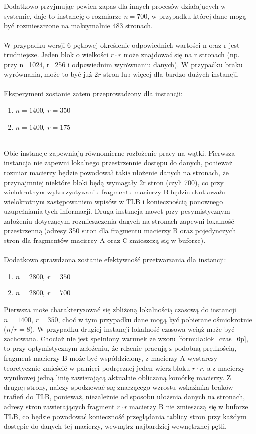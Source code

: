 \documentclass[12pt,a4paper]{article}
\begin{document}
Dodatkowo przyjmując pewien zapas dla innych procesów działających w systemie, daje to instancję o rozmiarze $n=700$, w przypadku której dane mogą być rozmieszczone na maksymalnie 483 stronach.\\
\\
W przypadku wersji 6 pętlowej określenie odpowiednich wartości n oraz r jest trudniejsze. Jeden blok o wielkości $r \cdot r$ może znajdować się na r stronach (np. przy n=1024, r=256 i odpowiednim wyrównaniu danych). W przypadku braku wyrównania, może to być już $2r$ stron lub więcej dla bardzo dużych instancji.\\
\\
Eksperyment zostanie zatem przeprowadzony dla instancji:
\begin{enumerate}[noitemsep]
\item $n=1400,~r=350$
\item $n=1400,~r=175$
\end{enumerate}
~\\
Obie instancje zapewniają równomierne rozłożenie pracy na wątki. Pierwsza instancja nie zapewni lokalnego przestrzennie dostępu do danych, ponieważ rozmiar macierzy będzie powodował takie ułożenie danych na stronach, że przynajmniej niektóre bloki będą wymagały 2r stron (czyli 700), co przy wielokrotnym wykorzystywaniu fragmentu macierzy B będzie skutkowało wielokrotnym zastępowaniem wpisów w TLB i koniecznością ponownego uzupełniania tych informacji. Druga instancja nawet przy pesymistycznym założeniu dotyczącym rozmieszczenia danych na stronach zapewni lokalność przestrzenną (adresy 350 stron dla fragmentu macierzy B oraz pojedynczych stron dla fragmentów macierzy A oraz C zmieszczą się w buforze).\\
\\
Dodatkowo sprawdzona zostanie efektywność przetwarzania dla instancji:
\begin{enumerate}[noitemsep]
\item $n=2800,~r=350$
\item $n=2800,~r=700$
\end{enumerate}

Pierwsza może charakteryzować się zbliżoną lokalnością czasową do instancji $n=1400$, $r=350$, choć w tym przypadku dane mogą być pobierane ośmiokrotnie ($n/r = 8$). W przypadku drugiej instancji lokalność czasowa wciąż może być zachowana. Chociaż nie jest spełniony warunek ze wzoru \ref{formula:lok_czas_6p}, to przy optymistycznym założeniu, że rdzenie pracują z podobną prędkością, fragment macierzy B może być współdzielony, z macierzy A wystarczy teoretycznie zmieścić w pamięci podręcznej jeden wierz bloku $r \cdot r$, a z macierzy wynikowej jedną linię zawierającą aktualnie obliczaną komórkę macierzy. Z drugiej strony, należy spodziewać się znaczącego wzrostu wskaźnika braków trafień do TLB, ponieważ, niezależnie od sposobu ułożenia danych na stronach, adresy stron zawierających fragment $r \cdot r$ macierzy B nie zmieszczą się w buforze TLB, co będzie powodować konieczność przeglądania tablicy stron przy każdym dostępie do danych tej macierzy, wewnątrz najbardziej wewnętrznej pętli.
\end{document}
